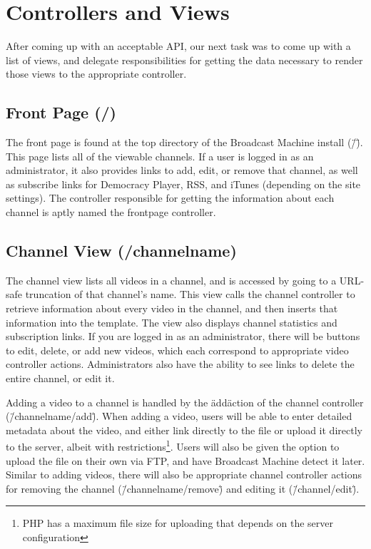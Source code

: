 \documentclass[a4paper,12pt]{report}
\begin{document}
\section{Controllers and Views}
After coming up with an acceptable API, our next task was to come up with a list of views, and delegate responsibilities for getting the data necessary to render those views to the appropriate controller.


\subsection{Front Page (/)}
The front page is found at the top directory of the Broadcast Machine install (\"/\").
This page lists all of the viewable channels.
If a user is logged in as an administrator, it also provides links to add, edit, or remove that channel, as well as subscribe links for Democracy Player, RSS, and iTunes (depending on the site settings).
The controller responsible for getting the information about each channel is aptly named the frontpage controller.


\subsection{Channel View (/channelname)}
The channel view lists all videos in a channel, and is accessed by going to a URL-safe truncation of that channel's name.
This view calls the channel controller to retrieve information about every video in the channel, and then inserts that information into the template.
The view also displays channel statistics and subscription links.
If you are logged in as an administrator, there will be buttons to edit, delete, or add new videos, which each correspond to appropriate video controller actions.
Administrators also have the ability to see links to delete the entire channel, or edit it.


Adding a video to a channel is handled by the \"add\" action of the channel controller (\"/channelname/add\").
When adding a video, users will be able to enter detailed metadata about the video, and either link directly to the file or upload it directly to the server, albeit with restrictions\footnote{PHP has a maximum file size for uploading that depends on the server configuration}.
Users will also be given the option to upload the file on their own via FTP, and have Broadcast Machine detect it later.
Similar to adding videos, there will also be appropriate channel controller actions for removing the channel (\"/channelname/remove\") and editing it (\"/channel/edit\").
\end{document}
